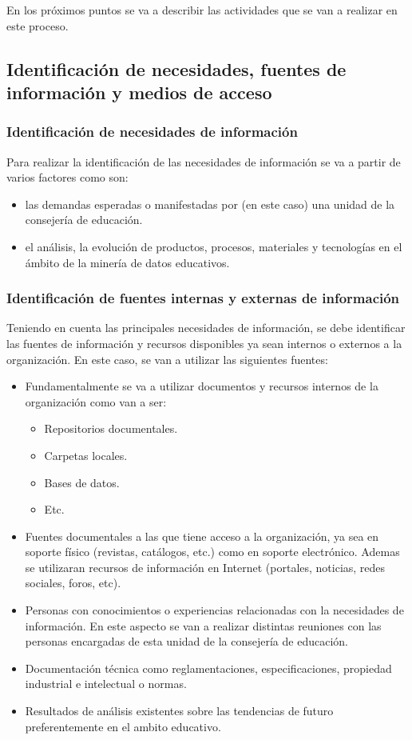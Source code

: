 En los próximos puntos se va a describir las actividades que se van a realizar en este proceso.

\subsection{Identificación de necesidades, fuentes de información y medios de acceso}
\subsubsection{Identificación de necesidades de información}
Para realizar la identificación de las necesidades de información se va a partir de varios factores como son:
\begin{itemize}
\item las demandas esperadas o manifestadas por (en este caso) una unidad de la consejería de educación.
\item el análisis, la evolución de productos, procesos, materiales y tecnologías en el ámbito de la minería de datos educativos.
\end{itemize}

\subsubsection{Identificación de fuentes internas y externas de información}
Teniendo en cuenta las principales necesidades de información, se debe identificar las fuentes de información y recursos disponibles ya sean internos o externos a la organización. En este caso, se van a utilizar las siguientes fuentes:
\begin{itemize}
\item Fundamentalmente se va a utilizar documentos y recursos internos de la organización como van a ser:
\begin{itemize}
\item Repositorios documentales.
\item Carpetas locales.
\item Bases de datos.
\item Etc.
\end{itemize}
\item Fuentes documentales a las que tiene acceso a la organización, ya sea en soporte físico (revistas, catálogos, etc.) como en soporte electrónico. Ademas se utilizaran recursos de información en Internet (portales, noticias, redes sociales, foros, etc). 
\item Personas con conocimientos o experiencias relacionadas con la necesidades de información. En este aspecto se van a realizar distintas reuniones con las personas encargadas de esta unidad de la consejería de educación.
\item Documentación técnica como reglamentaciones, especificaciones, propiedad industrial e intelectual o normas.
\item Resultados de análisis existentes sobre las tendencias de futuro preferentemente en el ambito educativo.
\end{itemize}

